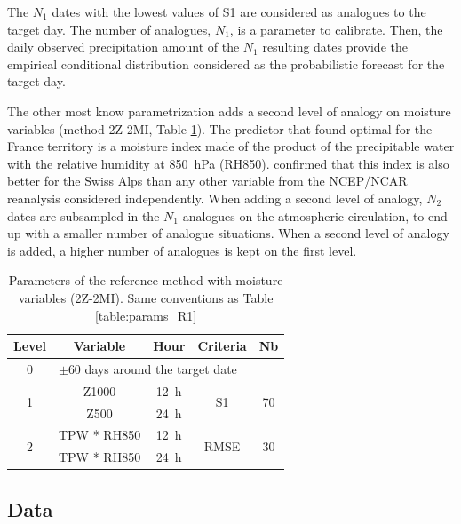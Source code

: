 \documentclass[5p]{elsarticle}
\begin{document}
The $N_{1}$ dates with the lowest values of S1 are considered as analogues to the target day. The number of analogues, $N_{1}$, is a parameter to calibrate. Then, the daily observed precipitation amount of the $N_{1}$ resulting dates provide the empirical conditional distribution considered as the probabilistic forecast for the target day.

The other most know parametrization adds a second level of analogy on moisture variables (method 2Z-2MI, Table \ref{table:params_R2}). The predictor that \citet{Bontron2004} found optimal for the France territory is a moisture index made of the product of the precipitable water with the relative humidity at 850~hPa (RH850). \cite{Horton2012a} confirmed that this index is also better for the Swiss Alps than any other variable from the NCEP/NCAR reanalysis considered independently. When adding a second level of analogy, $N_{2}$ dates are subsampled in the $N_{1}$ analogues on the atmospheric circulation, to end up with a smaller number of analogue situations. When a second level of analogy is added, a higher number of analogues is kept on the first level.

\begin{table}[htb]
	\caption{Parameters of the reference method with moisture variables (2Z-2MI). Same conventions as Table \ref{table:params_R1}}
	\footnotesize
	\begin{center}
		\begin{tabular}{ccccc}
			\hline 
			Level & Variable & Hour & Criteria & Nb \\ 
			\hline 
			0 & \multicolumn{4}{l}{$\pm 60$ days around the target date} \\
			\hline 
			\multirow{2}{*}{1} & Z1000 & 12~h & \multirow{2}{*}{S1} & \multirow{2}{*}{70} \\
			& Z500 & 24~h & & \\ 
			\hline
			\multirow{2}{*}{2} & TPW * RH850 & 12~h & \multirow{2}{*}{RMSE} & \multirow{2}{*}{30} \\
			& TPW * RH850 & 24~h & & \\ 
			\hline 
		\end{tabular} 
	\end{center}
	\label{table:params_R2}
\end{table}


\subsection{Data}
\label{sec:data}
\end{document}
